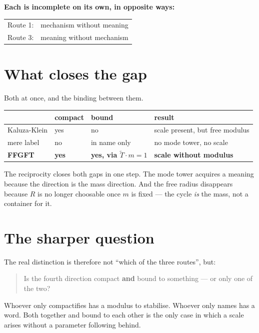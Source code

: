 \documentclass[11pt]{report}
\begin{document}
\textbf{Each is incomplete on its own, in opposite ways:}
\begin{center}
\begin{tabular}{ll}
Route 1: & mechanism without meaning \\
Route 3: & meaning without mechanism \\
\end{tabular}
\end{center}

\section{What closes the gap}

Both at once, and the binding between them.

\begin{center}
\begin{tabular}{lllp{4.6cm}}
\toprule
 & compact & bound & result \\
\midrule
Kaluza-Klein & yes & no & scale present, but free modulus \\
mere label & no & in name only & no mode tower, no scale \\
\textbf{FFGFT} & \textbf{yes} & \textbf{yes, via $\tilde T \cdot m = 1$}
  & \textbf{scale without modulus} \\
\bottomrule
\end{tabular}
\end{center}

The reciprocity closes both gaps in one step. The mode tower acquires a
meaning because the direction is the mass direction. And the free
radius disappears because $R$ is no longer choosable once $m$ is fixed
--- the cycle \emph{is} the mass, not a container for it.

\section{The sharper question}

The real distinction is therefore not \enquote{which of the three
routes}, but:

\begin{quote}
Is the fourth direction compact \textbf{and} bound to something --- or
only one of the two?
\end{quote}

Whoever only compactifies has a modulus to stabilise. Whoever only
names has a word. Both together and bound to each other is the only
case in which a scale arises without a parameter following behind.
\end{document}
